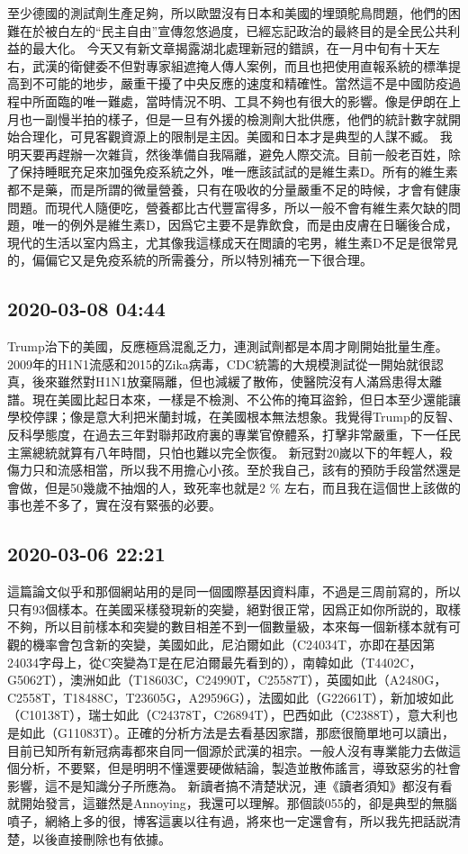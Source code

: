 \documentclass[twocolumn]{ctexart}
\begin{document}
至少德國的測試劑生產足夠，所以歐盟沒有日本和美國的埋頭鴕鳥問題，他們的困難在於被白左的“民主自由”宣傳忽悠過度，已經忘記政治的最終目的是全民公共利益的最大化。
今天又有新文章揭露湖北處理新冠的錯誤，在一月中旬有十天左右，武漢的衛健委不但對專家組遮掩人傳人案例，而且也把使用直報系統的標準提高到不可能的地步，嚴重干擾了中央反應的速度和精確性。當然這不是中國防疫過程中所面臨的唯一難處，當時情況不明、工具不夠也有很大的影響。像是伊朗在上月也一副慢半拍的樣子，但是一旦有外援的檢測劑大批供應，他們的統計數字就開始合理化，可見客觀資源上的限制是主因。美國和日本才是典型的人謀不臧。
我明天要再趕辦一次雜貨，然後準備自我隔離，避免人際交流。目前一般老百姓，除了保持睡眠充足來加强免疫系統之外，唯一應該試試的是維生素D。所有的維生素都不是藥，而是所謂的微量營養，只有在吸收的分量嚴重不足的時候，才會有健康問題。而現代人隨便吃，營養都比古代豐富得多，所以一般不會有維生素欠缺的問題，唯一的例外是維生素D，因爲它主要不是靠飲食，而是由皮膚在日曬後合成，現代的生活以室内爲主，尤其像我這樣成天在閲讀的宅男，維生素D不足是很常見的，偏偏它又是免疫系統的所需養分，所以特別補充一下很合理。
\subsection*{2020-03-08 04:44}

Trump治下的美國，反應極爲混亂乏力，連測試劑都是本周才剛開始批量生產。2009年的H1N1流感和2015的Zika病毒，CDC統籌的大規模測試從一開始就很認真，後來雖然對H1N1放棄隔離，但也減緩了散佈，使醫院沒有人滿爲患得太離譜。現在美國比起日本來，一樣是不檢測、不公佈的掩耳盜鈴，但日本至少還能讓學校停課；像是意大利把米蘭封城，在美國根本無法想象。我覺得Trump的反智、反科學態度，在過去三年對聯邦政府裏的專業官僚體系，打擊非常嚴重，下一任民主黨總統就算有八年時間，只怕也難以完全恢復。
新冠對20嵗以下的年輕人，殺傷力只和流感相當，所以我不用擔心小孩。至於我自己，該有的預防手段當然還是會做，但是50幾歲不抽烟的人，致死率也就是2 \% 左右，而且我在這個世上該做的事也差不多了，實在沒有緊張的必要。
\subsection*{2020-03-06 22:21}

這篇論文似乎和那個網站用的是同一個國際基因資料庫，不過是三周前寫的，所以只有93個樣本。在美國采樣發現新的突變，絕對很正常，因爲正如你所説的，取樣不夠，所以目前樣本和突變的數目相差不到一個數量級，本來每一個新樣本就有可觀的機率會包含新的突變，美國如此，尼泊爾如此（C24034T，亦即在基因第24034字母上，從C突變為T是在尼泊爾最先看到的），南韓如此（T4402C，G5062T），澳洲如此（T18603C，C24990T，C25587T），英國如此（A2480G，C2558T，T18488C，T23605G，A29596G），法國如此（G22661T），新加坡如此（C10138T），瑞士如此（C24378T，C26894T），巴西如此（C2388T），意大利也是如此（G11083T）。正確的分析方法是去看基因家譜，那麽很簡單地可以讀出，目前已知所有新冠病毒都來自同一個源於武漢的祖宗。一般人沒有專業能力去做這個分析，不要緊，但是明明不懂還要硬做結論，製造並散佈謠言，導致惡劣的社會影響，這不是知識分子所應為。
新讀者搞不清楚狀況，連《讀者須知》都沒有看就開始發言，這雖然是Annoying，我還可以理解。那個談055的，卻是典型的無腦噴子，網絡上多的很，博客這裏以往有過，將來也一定還會有，所以我先把話説清楚，以後直接刪除也有依據。
\end{document}

